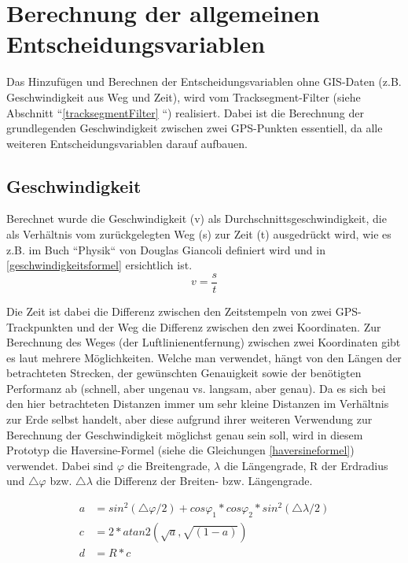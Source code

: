 \section{Berechnung der allgemeinen Entscheidungsvariablen}
Das Hinzufügen und Berechnen der Entscheidungsvariablen ohne GIS-Daten (z.B. Geschwindigkeit aus Weg und Zeit), wird vom Tracksegment-Filter (siehe Abschnitt ``\ref{tracksegmentFilter} ``) realisiert. Dabei ist die Berechnung der grundlegenden Geschwindigkeit zwischen zwei GPS-Punkten essentiell, da alle weiteren Entscheidungsvariablen darauf aufbauen. 

\subsection{Geschwindigkeit}
Berechnet wurde die Geschwindigkeit (v) als Durchschnittsgeschwindigkeit, die als Verhältnis vom zurückgelegten Weg (s) zur Zeit (t) ausgedrückt wird, wie es z.B. im Buch ``Physik`` von Douglas Giancoli definiert wird \cite[S.~27]{douglas_giancoli_physik_2010} und in \ref{geschwindigkeitsformel} ersichtlich ist. 
\begin{equation}
v = \frac{s}{t}
\label{geschwindigkeitsformel}
\end{equation}

Die Zeit ist dabei die Differenz zwischen den Zeitstempeln von zwei GPS-Trackpunkten und der Weg die Differenz zwischen den zwei Koordinaten. Zur Berechnung des Weges (der Luftlinienentfernung) zwischen zwei Koordinaten gibt es laut \cite{movable_type_ltd_calculate_2015} mehrere Möglichkeiten. Welche man verwendet, hängt von den Längen der betrachteten Strecken, der gewünschten Genauigkeit sowie der benötigten Performanz ab (schnell, aber ungenau vs. langsam, aber genau). Da es sich bei den hier betrachteten Distanzen immer um sehr kleine Distanzen im Verhältnis zur Erde selbst handelt, aber diese aufgrund ihrer weiteren Verwendung zur Berechnung der Geschwindigkeit möglichst genau sein soll, wird in diesem Prototyp die Haversine-Formel (siehe die Gleichungen \ref{haversineformel}) verwendet. Dabei sind $\varphi$ die Breitengrade, $\lambda$ die Längengrade, R der Erdradius und $\triangle\varphi$ bzw. $\triangle \lambda$ die Differenz der Breiten- bzw. Längengrade.\cite{movable_type_ltd_calculate_2015}

\begin{equation}
\label{haversineformel}
\begin{aligned}
a &= sin^{2}(\triangle \varphi/2) + cos \varphi_1  * cos \varphi_2 * sin^{2}(\triangle \lambda/2) \\
c &= 2 * atan2( \sqrt{a}, \sqrt{(1-a)}) \\
d &= R * c
\end{aligned}
\end{equation}

